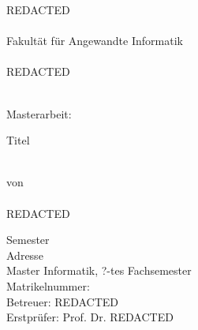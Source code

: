 \begin{titlepage}


\pagestyle{empty}



\begin{center}
	REDACTED\\
	\ \\
	Fakultät für Angewandte Informatik\\
	\ \\
	REDACTED   \\
	\ \\ 
\end{center}
\vspace{4cm}

\begin{center}
	Masterarbeit:
\end{center}
\begin{center}
	\begin{LARGE}
		Titel\\
	\end{LARGE}
	\ \\
	von\\
	\ \\
	REDACTED
\end{center}
\vfill


\begin{small}
	Semester \\
	Adresse \\
	Master Informatik, ?-tes Fachsemester\\
	Matrikelnummer:  \\
	Betreuer: REDACTED\\
	Erstprüfer: Prof. Dr. REDACTED \\
\end{small}

\clearpage


\end{titlepage}





\pagestyle{plain}
